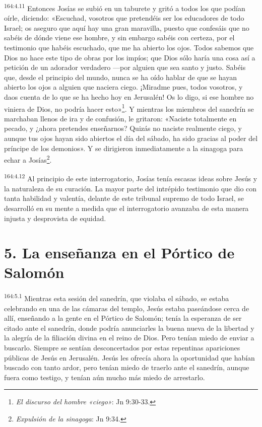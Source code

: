 \par
\textsuperscript{164:4.11} Entonces Josías se subió en un taburete y gritó a todos los que podían oírle, diciendo: «Escuchad, vosotros que pretendéis ser los educadores de todo Israel; os aseguro que aquí hay una gran maravilla, puesto que confesáis que no sabéis de dónde viene ese hombre, y sin embargo sabéis con certeza, por el testimonio que habéis escuchado, que me ha abierto los ojos. Todos sabemos que Dios no hace este tipo de obras por los impíos; que Dios sólo haría una cosa así a petición de un adorador verdadero ---por alguien que sea santo y justo. Sabéis que, desde el principio del mundo, nunca se ha oído hablar de que se hayan abierto los ojos a alguien que naciera ciego. ¡Miradme pues, todos vosotros, y daos cuenta de lo que se ha hecho hoy en Jerusalén! Os lo digo, si ese hombre no viniera de Dios, no podría hacer esto»\footnote{\textit{El discurso del hombre «ciego»}: Jn 9:30-33.}. Y mientras los miembros del sanedrín se marchaban llenos de ira y de confusión, le gritaron: «Naciste totalmente en pecado, y ¿ahora pretendes enseñarnos? Quizás no naciste realmente ciego, y aunque tus ojos hayan sido abiertos el día del sábado, ha sido gracias al poder del príncipe de los demonios». Y se dirigieron inmediatamente a la sinagoga para echar a Josías\footnote{\textit{Expulsión de la sinagoga}: Jn 9:34.}.

\par
\textsuperscript{164:4.12} Al principio de este interrogatorio, Josías tenía escasas ideas sobre Jesús y la naturaleza de su curación. La mayor parte del intrépido testimonio que dio con tanta habilidad y valentía, delante de este tribunal supremo de todo Israel, se desarrolló en su mente a medida que el interrogatorio avanzaba de esta manera injusta y desprovista de equidad.

\section*{5. La enseñanza en el Pórtico de Salomón}
\par
\textsuperscript{164:5.1} Mientras esta sesión del sanedrín, que violaba el sábado, se estaba celebrando en una de las cámaras del templo, Jesús estaba paseándose cerca de allí, enseñando a la gente en el Pórtico de Salomón; tenía la esperanza de ser citado ante el sanedrín, donde podría anunciarles la buena nueva de la libertad y la alegría de la filiación divina en el reino de Dios. Pero tenían miedo de enviar a buscarlo. Siempre se sentían desconcertados por estas repentinas apariciones públicas de Jesús en Jerusalén. Jesús les ofrecía ahora la oportunidad que habían buscado con tanto ardor, pero tenían miedo de traerlo ante el sanedrín, aunque fuera como testigo, y tenían aún mucho más miedo de arrestarlo.

